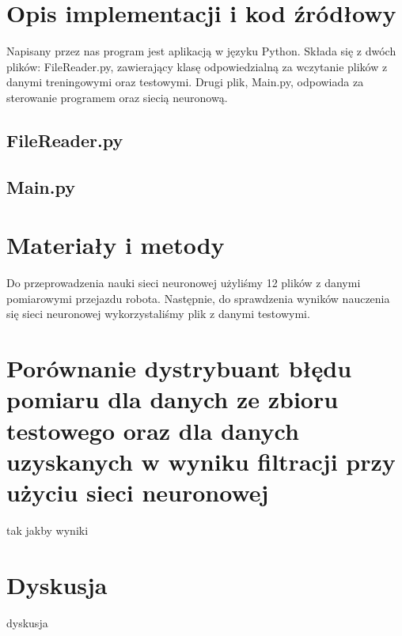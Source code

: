 \documentclass{classrep}
\begin{document}
\section{Opis implementacji i kod źródłowy} 
Napisany przez nas program jest aplikacją w języku Python. Składa się z dwóch plików: FileReader.py, zawierający klasę odpowiedzialną za wczytanie plików z danymi treningowymi oraz testowymi. Drugi plik, Main.py, odpowiada za sterowanie programem oraz siecią neuronową.

\subsection{FileReader.py}



\subsection{Main.py}




\section{Materiały i metody}
Do przeprowadzenia nauki sieci neuronowej użyliśmy 12 plików z danymi pomiarowymi przejazdu robota. Następnie, do sprawdzenia wyników nauczenia się sieci neuronowej wykorzystaliśmy plik z danymi testowymi. \cite{pliki}

\section{Porównanie dystrybuant błędu pomiaru dla danych ze zbioru testowego oraz dla danych uzyskanych w wyniku filtracji przy użyciu sieci neuronowej}

tak jakby wyniki

\section{Dyskusja} %
dyskusja
\end{document}
